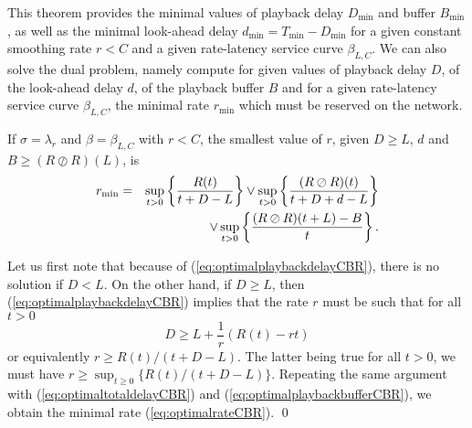 This theorem provides the minimal values of playback delay $D_{\min}$ and buffer $B_{\min}$, as well as the minimal look-ahead delay $d _{\min} = T_{\min} - D_{\min}$ for a given constant smoothing rate $r < C$ and a given rate-latency service curve $\beta_{L,C}$. We can also solve the dual problem, namely compute for given values of playback delay $D$, of the look-ahead delay $d$, of the playback buffer $B$ and for a given rate-latency service curve $\beta_{L,C}$, the minimal rate $r_{\min}$ which must be reserved on the network.

\begin{theorem}
If $\sigma = \lambda_r$ and  $\beta = \beta_{L,C}$ with $r < C$, the smallest value of $r$,
given $D \geq L$, $d$ and $B \geq (R \oslash R)(L)$, is
\begin{eqnarray}
 \mylabel{eq:optimalrateCBR}
r_{\min} & = & \sup_{t > 0} \left\{ \frac{R(t)}{t+D-L} \right\} \vee \sup_{t > 0} \left\{ \frac{(R \oslash R)(t)}{t+D+d-L} \right\} \nonumber \\
         & & \;\;\;\;\;\;\;\;\;\;\;\;\; \vee \sup_{t > 0} \left\{ \frac{(R \oslash R)(t+L) - B}{t} \right\}.
\end{eqnarray}
\end{theorem}

\pr Let us first note that because of (\ref{eq:optimalplaybackdelayCBR}), there is no solution if $D < L$.
On the other hand, if $D \geq L$, then  (\ref{eq:optimalplaybackdelayCBR}) implies that the rate $r$ must be such that for all $t > 0$
$$ D \geq L + \frac{1}{r} ( R(t) -rt )  $$
or equivalently $ r \geq R(t)/(t+D-L) $. The latter being true for all $t > 0$, we must have
$ r \geq \sup_{t \geq 0} \{ R(t)/(t+D-L) \}$.
Repeating the same argument with (\ref{eq:optimaltotaldelayCBR}) and (\ref{eq:optimalplaybackbufferCBR}), we obtain the minimal rate (\ref{eq:optimalrateCBR}).
\qed



